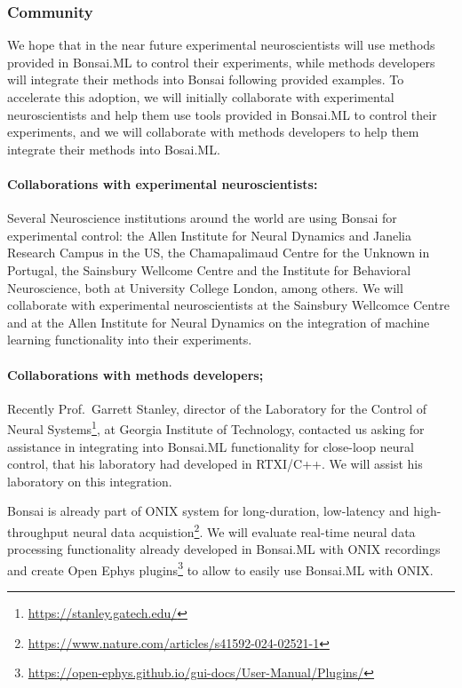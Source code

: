 \subsubsection*{Community}

We hope that in the near future experimental neuroscientists will use methods
provided in Bonsai.ML to control their experiments, while methods developers
will integrate their methods into Bonsai following provided examples. To
accelerate this adoption, we will initially collaborate with experimental
neuroscientists and help them use tools provided in Bonsai.ML to control their
experiments, and we will collaborate with methods developers to help them
integrate their methods into Bosai.ML.

\paragraph{Collaborations with experimental neuroscientists:} Several
Neuroscience institutions around the world are using Bonsai for experimental
control: the Allen Institute for Neural Dynamics and Janelia Research Campus in
the US, the Chamapalimaud Centre for the Unknown in Portugal, the Sainsbury
Wellcome Centre and the Institute for Behavioral Neuroscience, both at
University College London, among others. We will collaborate with experimental
neuroscientists at the Sainsbury Wellcomce Centre and at the Allen Institute
for Neural Dynamics on the integration of machine learning functionality into
their experiments.

\paragraph{Collaborations with methods developers;} Recently Prof.~Garrett
Stanley, director of the Laboratory for the Control of Neural
Systems\footnote[11]{\url{https://stanley.gatech.edu/}}, at Georgia Institute
of Technology, contacted us asking for assistance in integrating into Bonsai.ML
functionality for close-loop neural control, that his laboratory had developed
in RTXI/C++. We will assist his laboratory on this integration.

%

Bonsai is already part of ONIX system for long-duration, low-latency and
high-throughput neural data
acquistion\footnote[13]{\url{https://www.nature.com/articles/s41592-024-02521-1}}.  We
will evaluate real-time neural data processing functionality already developed
in Bonsai.ML with ONIX recordings and create Open Ephys
plugins\footnote[14]{\url{https://open-ephys.github.io/gui-docs/User-Manual/Plugins/}} to
allow to easily use Bonsai.ML with ONIX.

